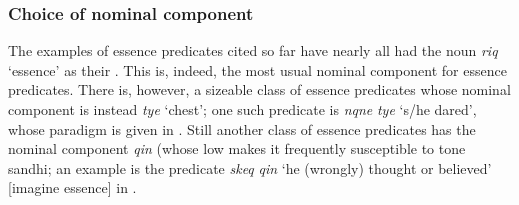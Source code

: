 \documentclass[output=paper]{langsci/langscibook}
\begin{document}
\subsubsection{Choice of nominal component}

The examples of essence predicates cited so far have nearly all had the noun \emph{riq} `essence' as their . This is, indeed, the most usual nominal component for essence predicates. There is,
however, a sizeable class of essence predicates whose nominal component is instead \emph{tye} `chest';
one such predicate is \emph{nqne} \emph{tye} `s/he dared', whose paradigm is given in . Still
another class of essence predicates has the nominal component \emph{qin} (whose low  makes it
frequently susceptible to tone sandhi; an example is the predicate \emph{skeq} \emph{qin} `he (wrongly) thought or believed' [imagine essence] in
.
\end{document}
